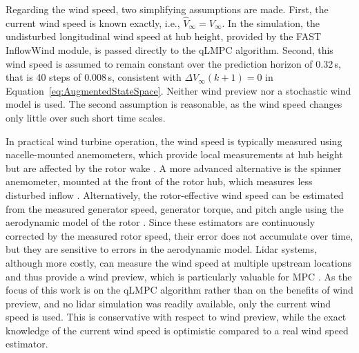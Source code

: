 Regarding the wind speed, two simplifying assumptions are made. First, the current wind speed is known exactly, i.e., $\hat{V}_\infty = V_\infty$. In the simulation, the undisturbed longitudinal wind speed at hub height, provided by the FAST InflowWind module, is passed directly to the qLMPC algorithm. Second, this wind speed is assumed to remain constant over the prediction horizon of 0.32\,s, that is 40 steps of 0.008\,s, consistent with $\Delta V_{\infty}(k+1) = 0$ in Equation~\eqref{eq:AugmentedStateSpace}. Neither wind preview nor a stochastic wind model is used. The second assumption is reasonable, as the wind speed changes only little over such short time scales.

In practical wind turbine operation, the wind speed is typically measured using nacelle-mounted anemometers, which provide local measurements at hub height but are affected by the rotor wake \cite{smith2002applicability}. A more advanced alternative is the spinner anemometer, mounted at the front of the rotor hub, which measures less disturbed inflow \cite{demurtas2017spinaranemometer}. Alternatively, the rotor-effective wind speed can be estimated from the measured generator speed, generator torque, and pitch angle using the aerodynamic model of the rotor \cite{soltani2013estimation}. Since these estimators are continuously corrected by the measured rotor speed, their error does not accumulate over time, but they are sensitive to errors in the aerodynamic model. Lidar systems, although more costly, can measure the wind speed at multiple upstream locations and thus provide a wind preview, which is particularly valuable for MPC \cite{schlipf2013nonlinear}. As the focus of this work is on the qLMPC algorithm rather than on the benefits of wind preview, and no lidar simulation was readily available, only the current wind speed is used. This is conservative with respect to wind preview, while the exact knowledge of the current wind speed is optimistic compared to a real wind speed estimator.

